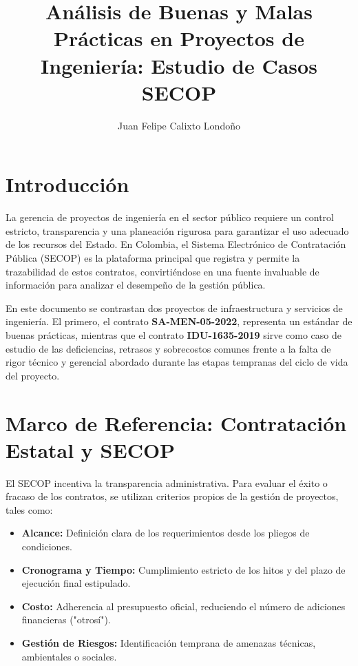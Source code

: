 \documentclass[9pt,a4paper,oneside]{rho-class/rho}
\title{Análisis de Buenas y Malas Prácticas en Proyectos de Ingeniería: Estudio de Casos SECOP}
\author[a,1]{Juan Felipe Calixto Londoño}
\affil[a]{Universidad Nacional de Colombia, Facultad de Ingeniería}
\begin{document}
    \maketitle
    \thispagestyle{firststyle}


\section{Introducción}

    La gerencia de proyectos de ingeniería en el sector público requiere un control estricto, transparencia y una planeación rigurosa para garantizar el uso adecuado de los recursos del Estado. En Colombia, el Sistema Electrónico de Contratación Pública (SECOP) es la plataforma principal que registra y permite la trazabilidad de estos contratos, convirtiéndose en una fuente invaluable de información para analizar el desempeño de la gestión pública.
    
    En este documento se contrastan dos proyectos de infraestructura y servicios de ingeniería. El primero, el contrato \textbf{SA-MEN-05-2022}, representa un estándar de buenas prácticas, mientras que el contrato \textbf{IDU-1635-2019} sirve como caso de estudio de las deficiencias, retrasos y sobrecostos comunes frente a la falta de rigor técnico y gerencial abordado durante las etapas tempranas del ciclo de vida del proyecto.

\section{Marco de Referencia: Contratación Estatal y SECOP}

    El SECOP incentiva la transparencia administrativa. Para evaluar el éxito o fracaso de los contratos, se utilizan criterios propios de la gestión de proyectos, tales como:
    \begin{itemize}
        \item \textbf{Alcance:} Definición clara de los requerimientos desde los pliegos de condiciones.
        \item \textbf{Cronograma y Tiempo:} Cumplimiento estricto de los hitos y del plazo de ejecución final estipulado.
        \item \textbf{Costo:} Adherencia al presupuesto oficial, reduciendo el número de adiciones financieras ("otrosí").
        \item \textbf{Gestión de Riesgos:} Identificación temprana de amenazas técnicas, ambientales o sociales.
    \end{itemize}
\end{document}

